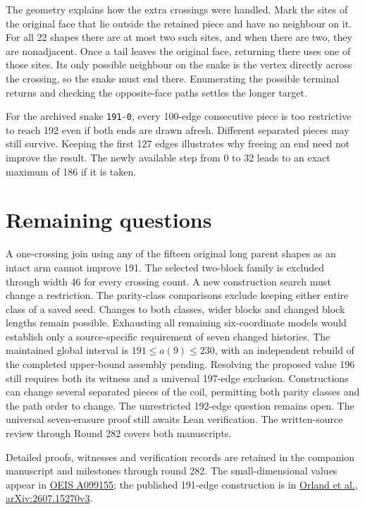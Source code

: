 \documentclass[11pt,a4paper]{article}
\begin{document}
The geometry explains how the extra crossings were handled. Mark the sites of the original face that lie outside the retained piece and have no neighbour on it. For all 22 shapes there are at most two such sites, and when there are two, they are nonadjacent. Once a tail leaves the original face, returning there uses one of those sites. Its only possible neighbour on the snake is the vertex directly across the crossing, so the snake must end there. Enumerating the possible terminal returns and checking the opposite-face paths settles the longer target.

For the archived snake \texttt{191-0}, every 100-edge consecutive piece is too restrictive to reach 192 even if both ends are drawn afresh. Different separated pieces may still survive. Keeping the first 127 edges illustrates why freeing an end need not improve the result. The newly available step from 0 to 32 leads to an exact maximum of 186 if it is taken.

\section{Remaining questions}
A one-crossing join using any of the fifteen original long parent
shapes as an intact arm cannot improve 191.
The selected two-block family is excluded through width 46 for every
crossing count. A new construction search must change a restriction.
The parity-class comparisons exclude keeping either entire class of a
saved seed. Changes to both classes, wider blocks and changed block
lengths remain possible.
Exhausting all remaining six-coordinate models would establish only a
source-specific requirement of seven changed histories.
The maintained global interval is $191\le a(9)\le230$, with an
independent rebuild of the completed upper-bound assembly pending.
Resolving the proposed value 196 still requires both its witness and
a universal 197-edge exclusion. Constructions can change several
separated pieces of the coil, permitting both parity classes and the
path order to change. The unrestricted 192-edge question remains open.
The universal seven-erasure proof still awaits Lean verification.
The written-source review through Round 282 covers both manuscripts.

\smallskip
{\small Detailed proofs, witnesses and verification records are retained
in the companion manuscript and milestones through round 282.
The small-dimensional values appear in
\href{https://oeis.org/A099155}{OEIS A099155}; the published 191-edge
construction is in
\href{https://arxiv.org/html/2607.15270v3}{Orland et al., arXiv:2607.15270v3}.}
\end{document}
